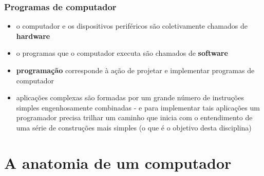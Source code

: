 \documentclass[aspectratio=169]{beamer}
\begin{document}
\begin{frame}\frametitle{Programas de computador}
\begin{itemize}
	\item o computador e os dispositivos periféricos são coletivamente chamados de \textbf{hardware}
	\item o programas que o computador executa são chamados de \textbf{software}
	\item \textbf{programação} corresponde à ação de projetar e implementar programas de computador
	\item aplicações complexas são formadas por um grande número de instruções simples engenhosamente combinadas - e para implementar tais aplicações um programador precisa trilhar um caminho que inicia com o entendimento de uma série de construções mais simples (o que é o objetivo desta disciplina)
\end{itemize}
\end{frame}

\section{A anatomia de um computador}
\end{document}
